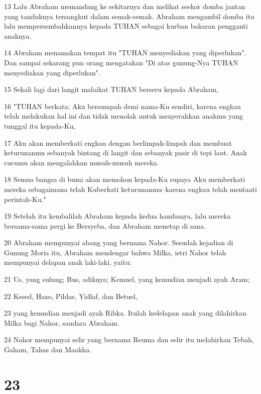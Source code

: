 \par 13 Lalu Abraham memandang ke sekitarnya dan melihat seekor domba jantan yang tanduknya tersangkut dalam semak-semak. Abraham mengambil domba itu lalu mempersembahkannya kepada TUHAN sebagai kurban bakaran pengganti anaknya.
\par 14 Abraham menamakan tempat itu "TUHAN menyediakan yang diperlukan". Dan sampai sekarang pun orang mengatakan "Di atas gunung-Nya TUHAN menyediakan yang diperlukan".
\par 15 Sekali lagi dari langit malaikat TUHAN berseru kepada Abraham,
\par 16 "TUHAN berkata: Aku bersumpah demi nama-Ku sendiri, karena engkau telah melakukan hal ini dan tidak menolak untuk menyerahkan anakmu yang tunggal itu kepada-Ku,
\par 17 Aku akan memberkati engkau dengan berlimpah-limpah dan membuat keturunanmu sebanyak bintang di langit dan sebanyak pasir di tepi laut. Anak cucumu akan mengalahkan musuh-musuh mereka.
\par 18 Semua bangsa di bumi akan memohon kepada-Ku supaya Aku memberkati mereka sebagaimana telah Kuberkati keturunanmu--karena engkau telah mentaati perintah-Ku."
\par 19 Setelah itu kembalilah Abraham kepada kedua hambanya, lalu mereka bersama-sama pergi ke Bersyeba, dan Abraham menetap di sana.
\par 20 Abraham mempunyai abang yang bernama Nahor. Sesudah kejadian di Gunung Moria itu, Abraham mendengar bahwa Milka, istri Nahor telah mempunyai delapan anak laki-laki, yaitu:
\par 21 Us, yang sulung; Bus, adiknya; Kemuel, yang kemudian menjadi ayah Aram;
\par 22 Kesed, Hazo, Pildas, Yidlaf, dan Betuel,
\par 23 yang kemudian menjadi ayah Ribka. Itulah kedelapan anak yang dilahirkan Milka bagi Nahor, saudara Abraham.
\par 24 Nahor mempunyai selir yang bernama Reuma dan selir itu melahirkan Tebah, Gaham, Tahas dan Maakha.

\chapter{23}

